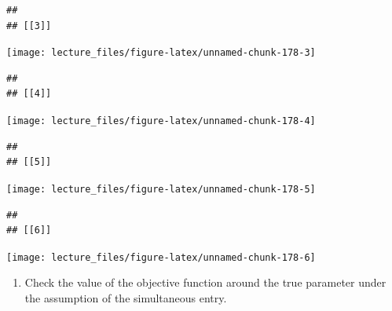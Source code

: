 \documentclass[]{book}
\providecommand{\tightlist}{%
  \setlength{\itemsep}{0pt}\setlength{\parskip}{0pt}}
\begin{document}
\begin{verbatim}
## 
## [[3]]
\end{verbatim}

\begin{center}\texttt{[image: lecture\_files/figure-latex/unnamed-chunk-178-3]} \end{center}

\begin{verbatim}
## 
## [[4]]
\end{verbatim}

\begin{center}\texttt{[image: lecture\_files/figure-latex/unnamed-chunk-178-4]} \end{center}

\begin{verbatim}
## 
## [[5]]
\end{verbatim}

\begin{center}\texttt{[image: lecture\_files/figure-latex/unnamed-chunk-178-5]} \end{center}

\begin{verbatim}
## 
## [[6]]
\end{verbatim}

\begin{center}\texttt{[image: lecture\_files/figure-latex/unnamed-chunk-178-6]} \end{center}

\begin{enumerate}
\def\labelenumi{\arabic{enumi}.}
\setcounter{enumi}{4}
\tightlist
\item
  Check the value of the objective function around the true parameter
  under the assumption of the simultaneous entry.
\end{enumerate}
\end{document}
